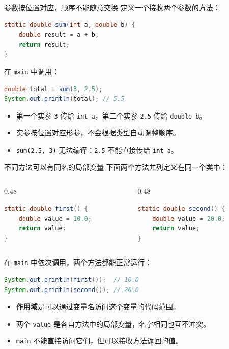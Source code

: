 \documentclass[aspectratio=169]{beamer}
\begin{document}
\begin{frame}[fragile]{参数按位置对应，顺序不能随意交换}
  定义一个接收两个参数的方法：
  \begin{lstlisting}[language=Java]
static double sum(int a, double b) {
    double result = a + b;
    return result;
}
  \end{lstlisting}
  在 \texttt{main} 中调用：
  \begin{lstlisting}[language=Java]
double total = sum(3, 2.5);
System.out.println(total); // 5.5
  \end{lstlisting}
  \begin{itemize}
    \item 第一个实参 \texttt{3} 传给 \texttt{int a}，第二个实参 \texttt{2.5} 传给 \texttt{double b}。
    \item 实参按\alert{位置}对应形参，不会根据类型自动调整顺序。
    \item \texttt{sum(2.5, 3)} 无法编译：\texttt{2.5} 不能直接传给 \texttt{int a}。
  \end{itemize}
\end{frame}

\begin{frame}[fragile]{不同方法可以有同名的局部变量}
  下面两个方法并列定义在同一个类中：
  \par\medskip
  \begin{columns}[T,onlytextwidth]
    \begin{column}{0.48\textwidth}
      \begin{lstlisting}[language=Java]
static double first() {
    double value = 10.0;
    return value;
}
      \end{lstlisting}
    \end{column}
    \begin{column}{0.48\textwidth}
      \begin{lstlisting}[language=Java]
static double second() {
    double value = 20.0;
    return value;
}
      \end{lstlisting}
    \end{column}
  \end{columns}
  在 \texttt{main} 中依次调用，两个方法都能正常运行：
  \begin{lstlisting}[language=Java]
System.out.println(first());  // 10.0
System.out.println(second()); // 20.0
  \end{lstlisting}
  \begin{itemize}
    \item \textbf{作用域}是可以通过变量名访问这个变量的代码范围。
    \item 两个 \texttt{value} 是各自方法中的局部变量，名字相同也互不冲突。
    \item \texttt{main} 不能直接访问它们，但可以接收方法返回的值。
  \end{itemize}
\end{frame}
\end{document}
